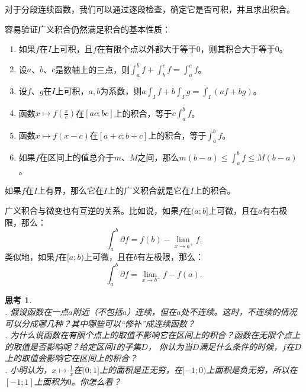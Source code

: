 \documentclass[12pt,UTF8]{ctexbook}
\newcommand{\lian}[1]{
    \underset{#1}{\operatorname{lian}\,}
}
\theoremstyle{definition}
\theoremstyle{plain}
\newtheorem{sk}{思考}[section]
\begin{document}
对于分段连续函数，我们可以通过逐段检查，确定它是否可积，并且求出积合。

容易验证广义积合仍然满足积合的基本性质：
\begin{enumerate}
    \item 如果$f$在$I$上可积，且$f$在有限个点以外都大于等于$0$，则其积合大于等于$0$。
    \item 设$a$、$b$、$c$是数轴上的三点，则$\int_a^b f + \int_b^c f = \int_a^c f$。
    \item 设$f$、$g$在$I$上可积，$a, b$为系数，则$ a \int_I f + b \int_I g = \int_I (af + bg) $。
    \item 函数$x\mapsto f\left(\frac{x}{c}\right)$在$[ac; bc]$上的积合，等于$c\int_a^b f$。
    \item 函数$x\mapsto f(x-c)$在$[a+c;b+c]$上的积合，等于$\int_a^b f$。
    \item 如果$f$在区间上的值总介于$m$、$M$之间，那么$m(b - a) \leqslant \int_a^b f \leqslant M(b - a)$。
\end{enumerate}

如果$f$在$I$上有界，那么它在$I$上的广义积合就是它在$I$上的积合。

广义积合与微变也有互逆的关系。比如说，如果$f$在$(a;b]$上可微，且在$a$有右极限，那么：
$$ \int_a^b \partial f = f(b) - \lian{x\to a^+} f.$$
类似地，如果$f$在$[a;b)$上可微，且在$b$有左极限，那么：
$$ \int_a^b \partial f = \lian{x\to b^-} f - f(a).$$

\begin{sk}
    \mbox{} \\
    . 假设函数在一点$a$附近（不包括$a$）连续，但在$a$处不连续。这时，不连续的情况可以分成哪几种？其中哪些可以“修补”成连续函数？\\
    . 为什么说函数在有限个点上的取值不影响它在区间上的积合？函数在无限个点上的取值是否影响呢？给定区间$I$的子集$D$，
    你认为当$D$满足什么条件的时候，$f$在$D$上的取值会影响它在区间上的积合？\\
    . 小明认为，$x\mapsto\frac{1}{x}$在$(0;1]$上的面积是正无穷，在$[-1;0)$上面积是负无穷，所以在$[-1;1]$上面积为$0$。你怎么看？
\end{sk}
\end{document}

